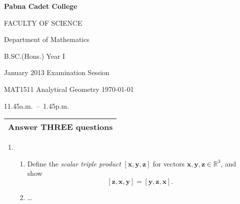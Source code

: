 \documentclass{article}
\begin{document}
\begin{center}
  \bfseries\large
  Pabna Cadet College

  FACULTY OF SCIENCE

  Department of Mathematics

  B.SC.(Hons.) Year I

  January 2013 Examination Session

  MAT1511 Analytical Geometry \qquad \today

  \bigskip

  \normalfont\normalsize
  11.45a.m.~--~1.45p.m.
\end{center}

\noindent
\begin{tabular}{p{\dimexpr\linewidth-2\tabcolsep}}
  Answer THREE questions \\
  \hline
\end{tabular}

\begin{enumerate}
  \item
  \begin{enumerate}
    \item
    Define the \textit{scalar triple product} $[\mathbf{x}, \mathbf{y}, \mathbf{z}]$ for vectors $\mathbf{x}, \mathbf{y}, \mathbf{z} \in \mathbb{R}^3$, and show
    \[
      [\mathbf{z}, \mathbf{x}, \mathbf{y}] = [\mathbf{y}, \mathbf{z}, \mathbf{x}].
    \]

    \item
    \ldots
  \end{enumerate}
\end{enumerate}
\end{document}
